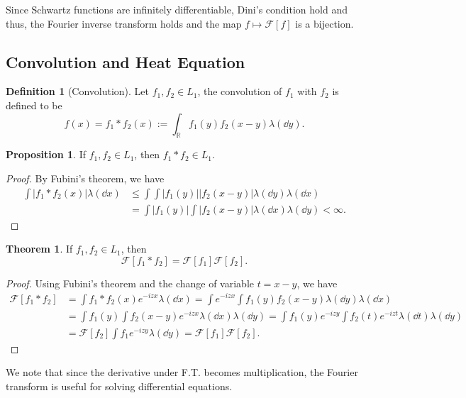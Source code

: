 \documentclass[]{article}
\theoremstyle{definition}
\newtheorem{theorem}{Theorem}
\theoremstyle{definition}
\newtheorem{definition}{Definition}[section]
\newtheorem{proposition}{Proposition}[section]
\begin{document}
Since Schwartz functions are infinitely differentiable, Dini's condition hold and thus, 
the Fourier inverse transform holds and the map \(f \mapsto \mathcal{F}[f]\) is a
bijection.

\subsection{Convolution and Heat Equation}

\begin{definition}[Convolution]
  Let \(f_1, f_2 \in L_1\), the convolution of \(f_1\) with \(f_2\) is defined to be 
  \[f(x) = f_1 * f_2(x) := \int_{\mathbb{R}} f_1(y)f_2(x - y) \lambda(\dd y).\]
\end{definition}

\begin{proposition}
  If \(f_1, f_2 \in L_1\), then \(f_1 * f_2 \in L_1\).
\end{proposition}
\begin{proof}
  By Fubini's theorem, we have 
  \[\begin{split}
    \int |f_1 * f_2(x)| \lambda(\dd x) & \le \int \int |f_1(y)| |f_2(x - y)| \lambda(\dd y) \lambda(\dd x) \\
     & = \int |f_1(y)| \int |f_2(x - y)| \lambda(\dd x) \lambda(\dd y) < \infty. 
    \end{split}\]
\end{proof}

\begin{theorem}
  If \(f_1, f_2 \in L_1\), then 
  \[\mathcal{F}[f_1 * f_2] = \mathcal{F}[f_1]\mathcal{F}[f_2].\]
\end{theorem}
\begin{proof}
  Using Fubini's theorem and the change of variable \(t = x - y\), we have 
  \[\begin{split}
    \mathcal{F}[f_1 * f_2] & = \int f_1 * f_2(x) e^{-i z x} \lambda(\dd x) 
      = \int e^{-izx}\int f_1(y)f_2(x - y) \lambda(\dd y) \lambda(\dd x) \\
    & = \int f_1(y)  \int f_2(x - y) e^{-izx} \lambda(\dd x) \lambda(\dd y) 
      = \int f_1(y) e^{-izy} \int f_2(t) e^{-izt} \lambda(\dd t) \lambda(\dd y)\\
    & = \mathcal{F}[f_2] \int f_1 e^{-izy} \lambda(\dd y) = \mathcal{F}[f_1] \mathcal{F}[f_2]. 
  \end{split}\]
\end{proof}

We note that since the derivative under F.T. becomes multiplication, the Fourier 
transform is useful for solving differential equations. 
\end{document}
